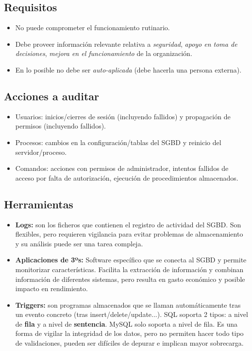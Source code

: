 \documentclass{article}
\begin{document}
\subsection{Requisitos}
\begin{itemize}
	\item No puede comprometer el funcionamiento rutinario.
	\item Debe proveer información relevante relativa a \textit{seguridad}, \textit{apoyo en toma de decisiones}, \textit{mejora en el funcionamiento} de la organización.
	\item En lo posible no debe ser \textit{auto-aplicada} (debe hacerla una persona externa).
\end{itemize}

\subsection{Acciones a auditar}
\begin{itemize}
	\item Usuarios: inicios/cierres de sesión (incluyendo fallidos) y propagación de permisos (incluyendo fallidos). 
	\item Procesos: cambios en la configuración/tablas del SGBD y reinicio del servidor/proceso.
	\item Comandos: acciones con permisos de administrador, intentos fallidos de acceso por falta de autorización, ejecución de procedimientos almacenados. 
\end{itemize}
\subsection{Herramientas}
\begin{itemize}
	\item \textbf{Logs:} son los ficheros que contienen el registro de actividad del SGBD. Son flexibles, pero requieren vigilancia para evitar problemas de almacenamiento y su análisis puede ser una tarea compleja. 
	\item \textbf{Aplicaciones de 3ºs:} Software específico que se conecta al SGBD y permite monitorizar características. Facilita la extracción de información y combinan información de diferentes sistemas, pero resulta en gasto económico y posible impacto en rendimiento. 
	\item \textbf{Triggers:} son programas almacenados que se llaman automáticamente tras un evento concreto (tras insert/delete/update...). SQL soporta 2 tipos: a nivel de \textbf{fila} y a nivel de \textbf{sentencia}. MySQL solo soporta a nivel de fila. Es una forma de vigilar la integridad de los datos, pero no permiten hacer todo tipo de validaciones, pueden ser difíciles de depurar e implican mayor sobrecarga. 
\end{itemize}
\end{document}
